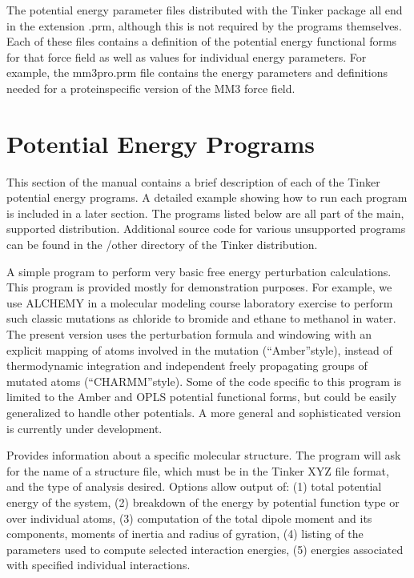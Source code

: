 \documentclass[letterpaper,11pt,english]{sphinxmanual}
\begin{document}

The potential energy parameter files distributed with the Tinker package all end in the extension .prm, although this is not required by the programs themselves. Each of these files contains a definition of the potential energy functional forms for that force field as well as values for individual energy parameters. For example, the mm3pro.prm file contains the energy parameters and definitions needed for a protein\sphinxhyphen{}specific version of the MM3 force field.


\chapter{Potential Energy Programs}
\label{\detokenize{text/energy-programs:potential-energy-programs}}\label{\detokenize{text/energy-programs::doc}}
This section of the manual contains a brief description of each of the Tinker potential energy programs. A detailed example showing how to run each program is included in a later section. The programs listed below are all part of the main, supported distribution. Additional source code for various unsupported programs can be found in the /other directory of the Tinker distribution.


A simple program to perform very basic free energy perturbation calculations. This program is provided mostly for demonstration purposes.  For example, we use ALCHEMY in a molecular modeling course laboratory exercise to perform such classic mutations as chloride to bromide and ethane to methanol in water. The present version uses the perturbation formula and windowing with an explicit mapping of atoms involved in the mutation (“Amber”\sphinxhyphen{}style), instead of thermodynamic integration and independent freely propagating groups of mutated atoms (“CHARMM”\sphinxhyphen{}style). Some of the code specific to this program is limited to the Amber and OPLS potential functional forms, but could be easily generalized to handle other potentials. A more general and sophisticated version is currently under development.


Provides information about a specific molecular structure. The program will ask for the name of a structure file, which must be in the Tinker XYZ file format, and the type of analysis desired. Options allow output of:  (1) total potential energy of the system, (2) breakdown of the energy by potential function type or over individual atoms, (3) computation of the total dipole moment and its components, moments of inertia and radius of gyration, (4) listing of the parameters used to compute selected interaction energies, (5) energies associated with specified individual interactions.
\end{document}
